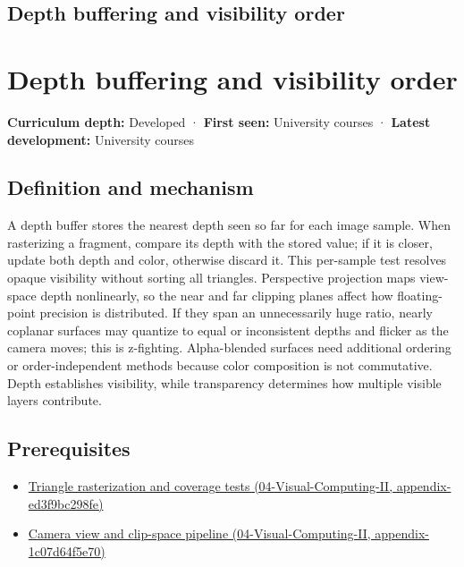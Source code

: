\hypertarget{appendix-97578ed97952}{}
\section*{Depth buffering and visibility order}
\chapter{Depth buffering and visibility order}\label{appendix-97578ed97952-depth-buffering-and-visibility-order}

\textbf{Curriculum depth:} Developed · \textbf{First seen:} University courses · \textbf{Latest development:} University courses

\section{Definition and mechanism}\label{appendix-97578ed97952-definition-and-mechanism}

A depth buffer stores the nearest depth seen so far for each image sample. When rasterizing a fragment, compare its depth with the stored value; if it is closer, update both depth and color, otherwise discard it. This per-sample test resolves opaque visibility without sorting all triangles. Perspective projection maps view-space depth nonlinearly, so the near and far clipping planes affect how floating-point precision is distributed. If they span an unnecessarily huge ratio, nearly coplanar surfaces may quantize to equal or inconsistent depths and flicker as the camera moves; this is z-fighting. Alpha-blended surfaces need additional ordering or order-independent methods because color composition is not commutative. Depth establishes visibility, while transparency determines how multiple visible layers contribute.

\section{Prerequisites}\label{appendix-97578ed97952-prerequisites}

\begin{itemize}
\tightlist
\item
  \href{../04-Visual-Computing-II/main.pdf\#nameddest=appendix-ed3f9bc298fe}{Triangle rasterization and coverage tests (04-Visual-Computing-II, appendix-ed3f9bc298fe)}
\item
  \href{../04-Visual-Computing-II/main.pdf\#nameddest=appendix-1c07d64f5e70}{Camera view and clip-space pipeline (04-Visual-Computing-II, appendix-1c07d64f5e70)}
\end{itemize}


